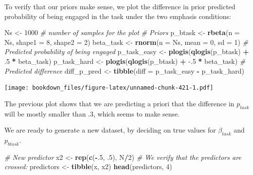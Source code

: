 \documentclass[12pt,]{krantz}
\newenvironment{Shaded}{\begin{snugshade}}{\end{snugshade}}
\newcommand{\KeywordTok}[1]{\textcolor[rgb]{0.13,0.29,0.53}{\textbf{#1}}}
\newcommand{\DataTypeTok}[1]{\textcolor[rgb]{0.13,0.29,0.53}{#1}}
\newcommand{\DecValTok}[1]{\textcolor[rgb]{0.00,0.00,0.81}{#1}}
\newcommand{\FloatTok}[1]{\textcolor[rgb]{0.00,0.00,0.81}{#1}}
\newcommand{\StringTok}[1]{\textcolor[rgb]{0.31,0.60,0.02}{#1}}
\newcommand{\CommentTok}[1]{\textcolor[rgb]{0.56,0.35,0.01}{\textit{#1}}}
\newcommand{\OperatorTok}[1]{\textcolor[rgb]{0.81,0.36,0.00}{\textbf{#1}}}
\newcommand{\NormalTok}[1]{#1}
\theoremstyle{definition}
\theoremstyle{definition}
\theoremstyle{definition}
\theoremstyle{remark}
\begin{document}
To verify that our priors make sense, we plot the difference in prior
predicted probability of being engaged in the task under the two
emphasis conditions:

\begin{Shaded}
\begin{Highlighting}[]
\NormalTok{Ns <-}\StringTok{ }\DecValTok{1000} \CommentTok{# number of samples for the plot}
\CommentTok{# Priors}
\NormalTok{p_btask <-}\StringTok{ }\KeywordTok{rbeta}\NormalTok{(}\DataTypeTok{n =}\NormalTok{ Ns, }\DataTypeTok{shape1 =} \DecValTok{8}\NormalTok{, }\DataTypeTok{shape2 =} \DecValTok{2}\NormalTok{)}
\NormalTok{beta_task <-}\StringTok{ }\KeywordTok{rnorm}\NormalTok{(}\DataTypeTok{n =}\NormalTok{ Ns, }\DataTypeTok{mean =} \DecValTok{0}\NormalTok{, }\DataTypeTok{sd =} \DecValTok{1}\NormalTok{)}
\CommentTok{# Predicted probability of being engaged}
\NormalTok{p_task_easy <-}\StringTok{ }\KeywordTok{plogis}\NormalTok{(}\KeywordTok{qlogis}\NormalTok{(p_btask) }\OperatorTok{+}\StringTok{ }\FloatTok{.5} \OperatorTok{*}\StringTok{ }\NormalTok{beta_task)}
\NormalTok{p_task_hard <-}\StringTok{ }\KeywordTok{plogis}\NormalTok{(}\KeywordTok{qlogis}\NormalTok{(p_btask) }\OperatorTok{+}\StringTok{ }\FloatTok{-.5} \OperatorTok{*}\StringTok{ }\NormalTok{beta_task)}
\CommentTok{# Predicted difference}
\NormalTok{diff_p_pred <-}\StringTok{ }\KeywordTok{tibble}\NormalTok{(}\DataTypeTok{diff =}\NormalTok{ p_task_easy }\OperatorTok{-}\StringTok{ }\NormalTok{p_task_hard)}
\end{Highlighting}
\end{Shaded}

\begin{Shaded}
\end{Shaded}

\texttt{[image: bookdown\_files/figure-latex/unnamed-chunk-421-1.pdf]}

The previous plot shows that we are predicting a priori that the
difference in \(p_{task}\) will be mostly smaller than \(.3\), which
seems to make sense.

We are ready to generate a new dataset, by deciding on true values for
\(\beta_{task}\) and \(p_{btask}\).

\begin{Shaded}
\begin{Highlighting}[]
\CommentTok{# New predictor}
\NormalTok{x2 <-}\StringTok{ }\KeywordTok{rep}\NormalTok{(}\KeywordTok{c}\NormalTok{(}\OperatorTok{-}\NormalTok{.}\DecValTok{5}\NormalTok{, }\FloatTok{.5}\NormalTok{), N}\OperatorTok{/}\DecValTok{2}\NormalTok{)}
\CommentTok{# We verify that the predictors are crossed:}
\NormalTok{predictors <-}\StringTok{ }\KeywordTok{tibble}\NormalTok{(x, x2)}
\KeywordTok{head}\NormalTok{(predictors, }\DecValTok{4}\NormalTok{)}
\end{Highlighting}
\end{Shaded}
\end{document}
